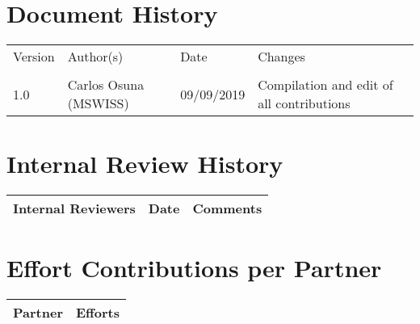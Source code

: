\documentclass[a4paper,10pt,twoside]{article}
\begin{document}


\clearpage
%
\cleardoublepage


\tableofcontents
\listoffigures
\listoftables

%

\newpage
\mbox{}\newpage









\section{Document History}

\begin{tabular}{|l|l|l|l|}
	\hline
	Version & Author(s) & Date & Changes \\ 
	&&& \\  \hline
	1.0 & Carlos Osuna (MSWISS) & 09/09/2019 & Compilation and edit of all contributions \\ \hline
\end{tabular}

\section{Internal Review History}

\begin{tabular}{|l|l|l|}
	\hline
	Internal Reviewers & Date & Comments \\ 
\hline
\end{tabular}

\section{Effort Contributions per Partner}
\begin{tabular}{|l|l|}
	\hline
	Partner& Efforts \\ 
	\hline
\end{tabular}



\cleardoublepage
\end{document}
